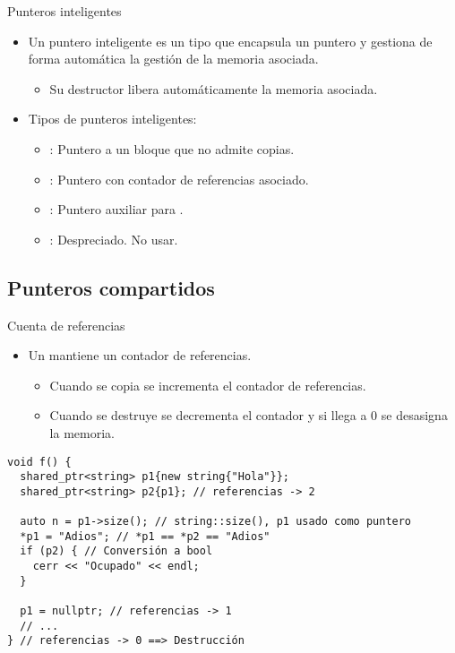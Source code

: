 \begin{frame}[fragile]{Punteros inteligentes}
\begin{itemize}
  \item Un \alert{puntero inteligente} es un tipo que encapsula un puntero
        y gestiona de forma automática la gestión de la memoria asociada.
    \begin{itemize}
      \item Su destructor libera automáticamente la memoria asociada.
    \end{itemize}
  \item Tipos de punteros inteligentes:
    \begin{itemize}
      \item {}: Puntero a un bloque que no admite copias.
      \item {}: Puntero con contador de referencias asociado.
      \item {}: Puntero auxiliar para .
      \item {}: Despreciado. \alert{No usar}.
    \end{itemize}
\end{itemize}
\end{frame}

\subsection{Punteros compartidos}

\begin{frame}[fragile]{Cuenta de referencias}
\begin{itemize}
  \item Un  mantiene un contador de referencias.
    \begin{itemize}
      \item Cuando se copia se incrementa el contador de referencias.
     \item Cuando se destruye se decrementa el contador y si llega a 0 se desasigna la memoria.
    \end{itemize}
\end{itemize}
\begin{lstlisting}
void f() {
  shared_ptr<string> p1{new string{"Hola"}};
  shared_ptr<string> p2{p1}; // referencias -> 2

  auto n = p1->size(); // string::size(), p1 usado como puntero
  *p1 = "Adios"; // *p1 == *p2 == "Adios"
  if (p2) { // Conversión a bool
    cerr << "Ocupado" << endl;
  }

  p1 = nullptr; // referencias -> 1
  // ...
} // referencias -> 0 ==> Destrucción

\end{lstlisting}
\end{frame}

